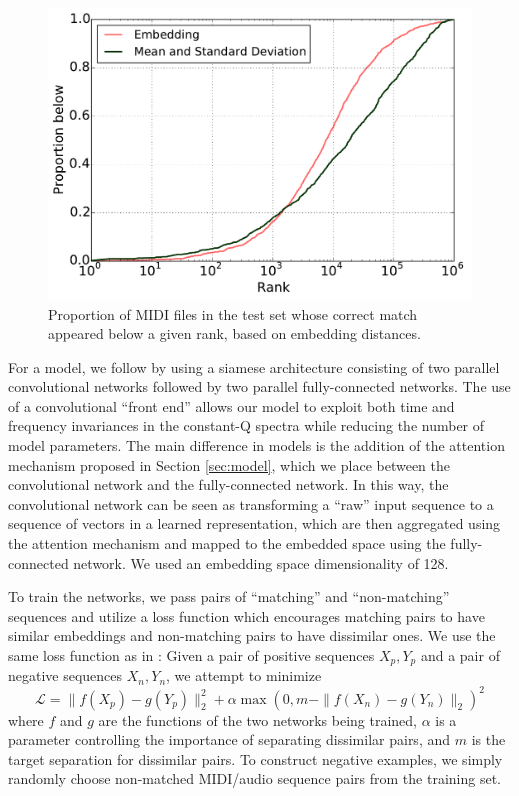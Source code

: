 \documentclass{article}
\begin{document}
\begin{figure}[t]
  \centering
  \includegraphics[width=\columnwidth]{ranks.pdf}
  \caption{Proportion of MIDI files in the test set whose correct match appeared below a given rank, based on embedding distances.}
  \label{fig:ranks}
\end{figure}

For a model, we follow \cite{raffel2015large} by using a siamese architecture consisting of two parallel convolutional networks followed by two parallel fully-connected networks.
The use of a convolutional ``front end'' allows our model to exploit both time and frequency invariances in the constant-Q spectra while reducing the number of model parameters.
The main difference in models is the addition of the attention mechanism proposed in Section \ref{sec:model}, which we place between the convolutional network and the fully-connected network.
In this way, the convolutional network can be seen as transforming a ``raw'' input sequence to a sequence of vectors in a learned representation, which are then aggregated using the attention mechanism and mapped to the embedded space using the fully-connected network.
We used an embedding space dimensionality of 128.

To train the networks, we pass pairs of ``matching'' and ``non-matching'' sequences and utilize a loss function which encourages matching pairs to have similar embeddings and non-matching pairs to have dissimilar ones.
We use the same loss function as in \cite{raffel2015large}: Given a pair of positive sequences $X_p, Y_p$ and a pair of negative sequences $X_n, Y_n$, we attempt to minimize
$$
\mathcal{L} = \|f(X_p) - g(Y_p)\|_2^2 + \alpha \max(0, m - \|f(X_n) - g(Y_n)\|_2)^2
$$
where $f$ and $g$ are the functions of the two networks being trained, $\alpha$ is a parameter controlling the importance of separating dissimilar pairs, and $m$ is the target separation for dissimilar pairs.
To construct negative examples, we simply randomly choose non-matched MIDI/audio sequence pairs from the training set.
\end{document}
